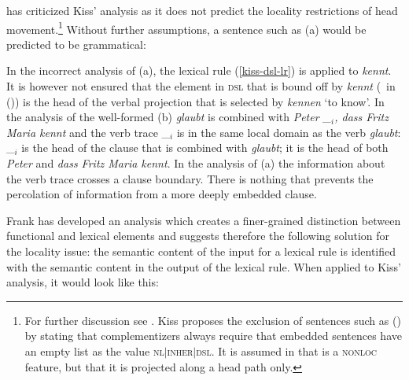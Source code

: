 \begin{exe}
\begin{xlist}
\noindent
\citet{Frank94} has criticized Kiss' analysis as it does not predict the locality
restrictions of head movement.\footnote{
		For further discussion see . Kiss proposes
		the exclusion of sentences such as () by stating that complementizers
		always require that embedded sentences have an empty list as the value
		\textsc{nl$|$inher$|$dsl}. It is assumed in  that \dsl is  
		a \textsc{nonloc} feature, but that it is projected along a head path only.%
}
Without further assumptions, a sentence such as (a) 
would be predicted to be grammatical:

\eal
{}
\zl
In the incorrect analysis of (a), the lexical rule (\ref{kiss-dsl-lr}) is applied
to \emph{kennt}. It is however not ensured that the element in \textsc{dsl} that is bound off by
\emph{kennt} (\, in ()) is the head of the verbal projection that is selected by
\emph{kennen} `to know'. In the analysis of the well-formed (b) \emph{glaubt} is combined
with \emph{Peter \_$_i$,  dass Fritz Maria kennt} and the verb trace \_$_i$ is in the same local
domain as the verb \emph{glaubt}: \_$_i$ is the head of the clause that is combined with
\emph{glaubt}; it is the head of both \emph{Peter} and \emph{dass Fritz Maria kennt}. In the analysis of (a) the information about the verb trace crosses a clause
boundary. There is nothing that prevents the percolation of \dsl information from a more deeply
embedded clause. 

Frank has developed an analysis which creates a finer-grained distinction between functional
and lexical elements and suggests therefore the following solution for the locality issue:
the semantic content of the input for a lexical rule is identified with the semantic content
in the output of the lexical rule. When applied to Kiss' analysis, it would look like this:


\end{xlist}
\end{exe}
